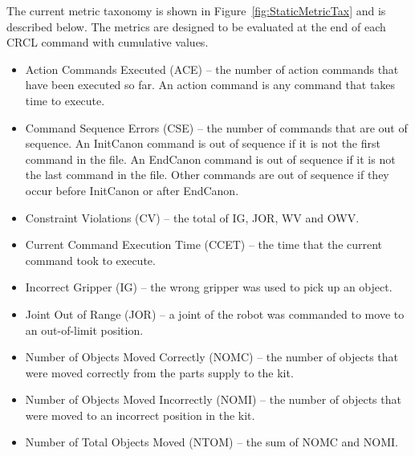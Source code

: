 The current metric taxonomy is shown in Figure~\ref{fig:StaticMetricTax} and is
described below. The metrics are designed to be evaluated at the end of each
CRCL command with cumulative values.

\begin{itemize}

\item \sf Action Commands Executed (ACE) \rm -- the number of action commands that
  have been executed so far. An action command is any command that takes
  time to execute.\\

\item \sf Command Sequence Errors (CSE) \rm -- the number of commands that are
  out of sequence. An InitCanon command is out of sequence if it is not the
  first command in the file. An EndCanon command is out of sequence if it
  is not the last command in the file. Other commands are out of sequence
  if they occur before InitCanon or after EndCanon.\\

\item \sf Constraint Violations (CV) \rm -- the total of IG, JOR, WV and OWV.\\

\item \sf Current Command Execution Time (CCET) \rm -- the time that the current
   command took to execute.\\

\item \sf Incorrect Gripper (IG) \rm -- the wrong gripper was used to pick up an object.\\

\item \sf Joint Out of Range (JOR) \rm -- a joint of the robot was commanded to
  move to an out-of-limit position.\\

\item \sf Number of Objects Moved Correctly (NOMC) \rm -- the number of objects
  that were moved correctly from the parts supply to the kit.\\

\item \sf Number of Objects Moved Incorrectly (NOMI) \rm -- the number of objects
  that were moved to an incorrect position in the kit.\\

\item \sf Number of Total Objects Moved (NTOM) \rm -- the sum of NOMC and NOMI.\\


\end{itemize}
